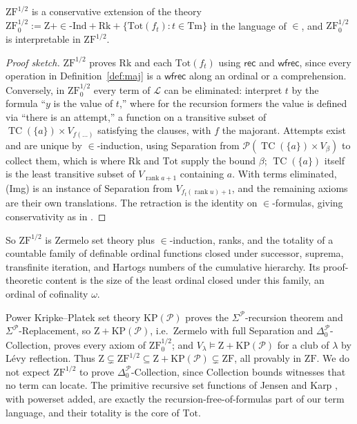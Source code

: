 \documentclass[10pt]{article}
\newcommand{\ZF}{\mathrm{ZF}}
\newcommand{\ZFh}{\mathrm{ZF}^{1/2}}
\newcommand{\Z}{\mathrm{Z}}
\newcommand{\KPP}{\mathrm{KP}(\mathcal P)}
\newcommand{\rk}{\operatorname{rank}}
\newcommand{\TC}{\operatorname{TC}}
\newcommand{\PP}{\mathcal{P}}
\newcommand{\rec}{\mathsf{rec}}
\newcommand{\wfrec}{\mathsf{wfrec}}
\newcommand{\Lang}{\mathcal L}
\newcommand{\Terms}{\mathrm{Tm}}
\begin{document}
\begin{proposition}\label{prop:termfree}
$\ZFh$ is a conservative extension of the theory
$\ZFh_0:=\Z+{\in}\text{-}\mathrm{Ind}+\mathrm{Rk}+\{\mathrm{Tot}(f_t):t\in\Terms\}$
in the language of $\in$, and $\ZFh_0$ is interpretable in $\ZFh$.
\end{proposition}
\begin{proof}[Proof sketch]
$\ZFh$ proves $\mathrm{Rk}$ and each $\mathrm{Tot}(f_t)$ using $\rec$ and
$\wfrec$, since every operation in Definition~\ref{def:maj} is a
$\wfrec$ along an ordinal or a comprehension. Conversely, in $\ZFh_0$ every
term of $\Lang$ can be eliminated: interpret $t$ by the formula
``$y$ is the value of $t$,'' where for the recursion formers the value is
defined via ``there is an attempt,'' a function on a transitive subset of
$\TC(\{a\})\times V_{f(\ldots)}$ satisfying the clauses, with $f$ the
majorant. Attempts exist and are unique by $\in$-induction, using
Separation from $\PP(\TC(\{a\})\times V_\beta)$ to collect them, which is
where $\mathrm{Rk}$ and $\mathrm{Tot}$ supply the bound $\beta$; $\TC(\{a\})$
itself is the least transitive subset of $V_{\rk a+1}$ containing $a$.
With terms eliminated, (Img) is an instance of Separation from
$V_{f_t(\rk u)+1}$, and the remaining axioms are their own translations.
The retraction is the identity on $\in$-formulas, giving conservativity
as in \cite[\S2.3]{miquel06}.
\end{proof}

So $\ZFh$ is Zermelo set theory plus $\in$-induction, ranks, and the
totality of a countable family of definable ordinal functions closed
under successor, suprema, transfinite iteration, and Hartogs numbers of
the cumulative hierarchy. Its proof-theoretic content is the size of the
least ordinal closed under this family, an ordinal of cofinality
$\omega$.

\begin{remark}[placement]
Power Kripke--Platek set theory $\KPP$ \cite{rathjen14} proves the
$\Sigma^{\PP}$-recursion theorem and $\Sigma^{\PP}$-Replacement, so
$\Z+\KPP$, i.e.\ Zermelo with full Separation and
$\Delta_0^{\PP}$-Collection, proves every axiom of $\ZFh_0$; and
$V_\lambda\models\Z+\KPP$ for a club of $\lambda$ by L\'evy reflection.
Thus $\Z\subsetneq\ZFh\subseteq\Z+\KPP\subsetneq\ZF$, all provably in
$\ZF$. We do not expect $\ZFh$ to prove $\Delta_0^{\PP}$-Collection,
since Collection bounds witnesses that no term can locate. The
primitive recursive set functions of Jensen and Karp \cite{jensenkarp71},
with powerset added, are exactly the recursion-free-of-formulas part of
our term language, and their totality is the core of $\mathrm{Tot}$.
\end{remark}
\end{document}
